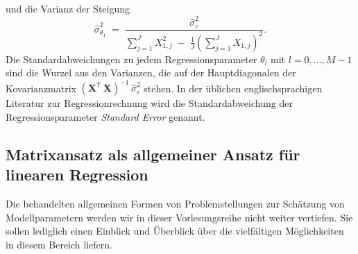und die Varianz der Steigung
\begin{equation}
\hat \sigma^2_{\theta_1} \; = \; 
\frac{\hat \sigma^2_\varepsilon}{\sum\limits_{j=1}^J X_{1,j}^2 \; - \; 
	\frac{1}{J}\left(\sum\limits_{j=1}^J X_{1,j}\right)^2} .
\end{equation}
Die Standardabweichungen zu jedem Regressionsparameter $\theta_l$ mit $l = 0,\dots,M-1$ sind
die Wurzel aus den Varianzen, die auf der Hauptdiagonalen der Kovarianzmatrix 
$\left( \mathbf{X}^\mathsf{T}  \, \mathbf{X} \right)^{-1} \, \hat \sigma_{\varepsilon}^2$
stehen. In der üblichen englischsprachigen Literatur zur Regressionrechnung wird
die Standardabweichung der Regressionsparameter \textsl{Standard Error} genannt.




\subsection{Matrixansatz als allgemeiner Ansatz für linearen Regression}
Die behandelten allgemeinen Formen von Problemstellungen zur Schätzung von Modellparametern
werden wir in dieser Vorlesungsreihe nicht weiter vertiefen. Sie sollen lediglich einen Einblick und Überblick über die vielfältigen Möglichkeiten in diesem Bereich liefern.

